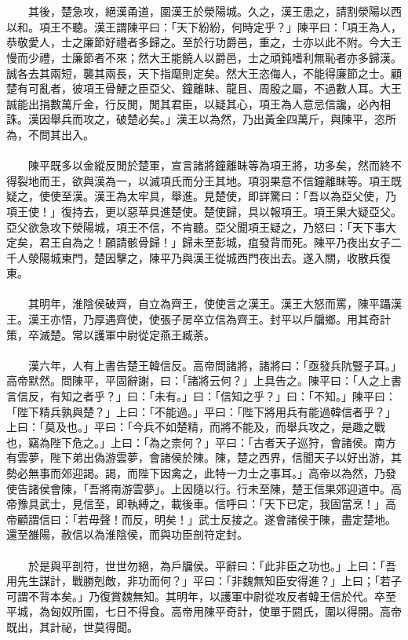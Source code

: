 \\\\
　　其後，楚急攻，絕漢甬道，圍漢王於滎陽城。久之，漢王患之，請割滎陽以西以和。項王不聽。漢王謂陳平曰：「天下紛紛，何時定乎？」陳平曰：「項王為人，恭敬愛人，士之廉節好禮者多歸之。至於行功爵邑，重之，士亦以此不附。今大王慢而少禮，士廉節者不來；然大王能饒人以爵邑，士之頑鈍嗜利無恥者亦多歸漢。誠各去其兩短，襲其兩長，天下指麾則定矣。然大王恣侮人，不能得廉節之士。顧楚有可亂者，彼項王骨鯁之臣亞父、鐘離眛、龍且、周殷之屬，不過數人耳。大王誠能出捐數萬斤金，行反閒，閒其君臣，以疑其心，項王為人意忌信讒，必內相誅。漢因舉兵而攻之，破楚必矣。」漢王以為然，乃出黃金四萬斤，與陳平，恣所為，不問其出入。
\\\\
　　陳平既多以金縱反閒於楚軍，宣言諸將鐘離眛等為項王將，功多矣，然而終不得裂地而王，欲與漢為一，以滅項氏而分王其地。項羽果意不信鐘離眛等。項王既疑之，使使至漢。漢王為太牢具，舉進。見楚使，即詳驚曰：「吾以為亞父使，乃項王使！」復持去，更以惡草具進楚使。楚使歸，具以報項王。項王果大疑亞父。亞父欲急攻下滎陽城，項王不信，不肯聽。亞父聞項王疑之，乃怒曰：「天下事大定矣，君王自為之！願請骸骨歸！」歸未至彭城，疽發背而死。陳平乃夜出女子二千人滎陽城東門，楚因擊之，陳平乃與漢王從城西門夜出去。遂入關，收散兵復東。
\\\\
　　其明年，淮陰侯破齊，自立為齊王，使使言之漢王。漢王大怒而罵，陳平躡漢王。漢王亦悟，乃厚遇齊使，使張子房卒立信為齊王。封平以戶牖鄉。用其奇計策，卒滅楚。常以護軍中尉從定燕王臧荼。
\\\\
　　漢六年，人有上書告楚王韓信反。高帝問諸將，諸將曰：「亟發兵阬豎子耳。」高帝默然。問陳平，平固辭謝，曰：「諸將云何？」上具告之。陳平曰：「人之上書言信反，有知之者乎？」曰：「未有。」曰：「信知之乎？」曰：「不知。」陳平曰：「陛下精兵孰與楚？」上曰：「不能過。」平曰：「陛下將用兵有能過韓信者乎？」上曰：「莫及也。」平曰：「今兵不如楚精，而將不能及，而舉兵攻之，是趣之戰也，竊為陛下危之。」上曰：「為之柰何？」平曰：「古者天子巡狩，會諸侯。南方有雲夢，陛下弟出偽游雲夢，會諸侯於陳。陳，楚之西界，信聞天子以好出游，其勢必無事而郊迎謁。謁，而陛下因禽之，此特一力士之事耳。」高帝以為然，乃發使告諸侯會陳，「吾將南游雲夢」。上因隨以行。行未至陳，楚王信果郊迎道中。高帝豫具武士，見信至，即執縛之，載後車。信呼曰：「天下已定，我固當烹！」高帝顧謂信曰：「若毋聲！而反，明矣！」武士反接之。遂會諸侯于陳，盡定楚地。還至雒陽，赦信以為淮陰侯，而與功臣剖符定封。
\\\\
　　於是與平剖符，世世勿絕，為戶牖侯。平辭曰：「此非臣之功也。」上曰：「吾用先生謀計，戰勝剋敵，非功而何？」平曰：「非魏無知臣安得進？」上曰；「若子可謂不背本矣。」乃復賞魏無知。其明年，以護軍中尉從攻反者韓王信於代。卒至平城，為匈奴所圍，七日不得食。高帝用陳平奇計，使單于閼氏，圍以得開。高帝既出，其計祕，世莫得聞。
